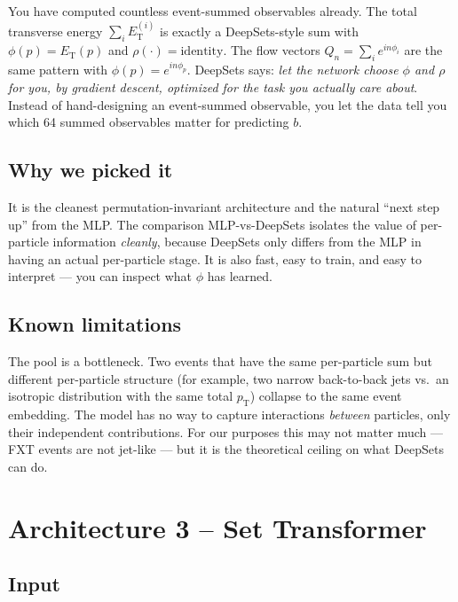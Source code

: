 \documentclass[11pt]{article}
\newcommand{\pT}{\ensuremath{p_{\text{T}}}}
\begin{document}
You have computed countless event-summed observables already. The
total transverse energy $\sum_i E_{\text{T}}^{(i)}$ is exactly a
DeepSets-style sum with $\phi(p) = E_{\text{T}}(p)$ and
$\rho(\cdot) = \mathrm{identity}$. The flow vectors
$Q_n = \sum_i e^{in\phi_i}$ are the same pattern with
$\phi(p) = e^{in\phi_p}$. DeepSets says: \emph{let the network choose
$\phi$ and $\rho$ for you, by gradient descent, optimized for the task
you actually care about}. Instead of hand-designing an event-summed
observable, you let the data tell you which 64 summed observables
matter for predicting $b$.

\subsection{Why we picked it}

It is the cleanest permutation-invariant architecture and the natural
``next step up'' from the MLP. The comparison MLP-vs-DeepSets isolates
the value of per-particle information \emph{cleanly}, because
DeepSets only differs from the MLP in having an actual per-particle
stage. It is also fast, easy to train, and easy to interpret --- you
can inspect what $\phi$ has learned.

\subsection{Known limitations}

The pool is a bottleneck. Two events that have the same per-particle
sum but different per-particle structure (for example, two narrow
back-to-back jets vs.\ an isotropic distribution with the same total
$\pT$) collapse to the same event embedding. The model has no way to
capture interactions \emph{between} particles, only their independent
contributions. For our purposes this may not matter much --- FXT
events are not jet-like --- but it is the theoretical ceiling on what
DeepSets can do.

\clearpage
\section{Architecture 3 -- Set Transformer}
\label{sec:settransformer}

\subsection{Input}
\end{document}
